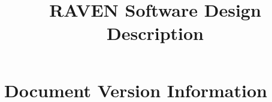 \documentclass{article}
\title{RAVEN Software Design Description}
\begin{document}
\maketitle







\section*{Document Version Information}


\end{document}
